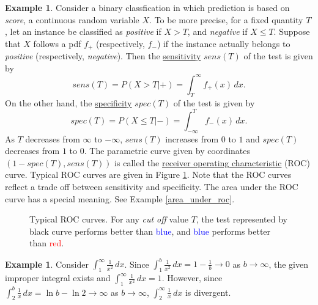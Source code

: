 \documentclass[12pt,letterpaper]{book}
\def\red{\textcolor{red}}
\def\blue{\textcolor{blue}}
\numberwithin{equation}{section}
\theoremstyle{definition}
\newtheorem{example}[thm]{\textbf{Example}}
\begin{document}
\begin{example}\label{sens_spec}
Consider a binary classfication in which prediction is based on \textit{score}, a continuous random variable $X$. To be more precise, for a fixed quantity $T$, let an instance be classified as \textit{positive} if $X>T$,  and \textit{negative} if $X\leq T$. Suppose that $X$ follows a pdf $f_{+}$ (respectively, $f_{-}$) if the instance actually belongs to \textit{positive} (respectively, \textit{negative}). Then the \underline{sensitivity} $sens(T)$ of the test is given by 
$$sens(T)=P(X>T|+)=\int_T^\infty f_{+}(x)\,dx.$$
On the other hand, the \underline{specificity} $spec(T)$ of the test is given by
$$spec(T)=P(X\leq T|-)=\int_{-\infty}^T f_{-}(x)\,dx.$$
As $T$ decreases from $\infty$ to $-\infty$, $sens(T)$ increases from $0$ to $1$ and $spec(T)$ decreases from $1$ to $0$. The parametric curve given by coordinates $(1-spec(T),sens(T))$ is called the \underline{receiver operating characteristic} (ROC) curve. Typical ROC curves are given in Figure \ref{ROC}. Note that the ROC curves reflect a trade off between sensitivity and specificity. The area under the ROC curve has a special meaning. See Example \ref{area_under_roc}.
\end{example}

\begin{figure}[h]
\begin{center}
\end{center}
\caption{Typical ROC curves. For any \textit{cut off} value $T$, the test represented by black curve performs better than \blue{blue}, and \blue{blue} performs better than \red{red}.}
\label{ROC}
\end{figure}

\begin{example} Consider $\displaystyle{\int_1^\infty \frac{1}{x^2}\,dx}$. Since $\displaystyle{\int_1^b \frac{1}{x^2}\,dx=1-\frac{1}{b}\to 0}$ as $b\to \infty$, the given improper integral exists and $\displaystyle{\int_1^\infty \frac{1}{x^2}\,dx=1}$. However, since $\displaystyle{\int_2^b \frac{1}{x}\,dx=\ln b -\ln 2\to \infty}$ as $b\to\infty$, $\displaystyle{\int_2^\infty \frac{1}{x}\,dx}$ is divergent.
\end{example}
\end{document}
